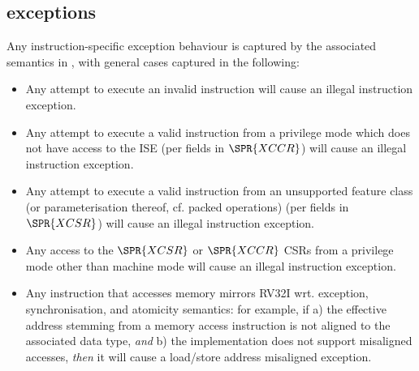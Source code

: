 \subsection{\XCID exceptions}
\label{sec:spec:exceptions}


Any instruction-specific exception behaviour is captured by the associated
semantics in , with general cases captured in
the following:

\begin{itemize}
\item Any attempt to execute an
      invalid \XCID instruction
      will cause an 
      illegal instruction exception.
\item Any attempt to execute a
        valid \XCID instruction
      from a privilege mode which does not have access to the ISE
      (per fields in $\SPR{XCCR}$)
      will cause an
      illegal instruction exception.
\item Any attempt to execute a
        valid \XCID instruction
      from an unsupported feature class (or parameterisation thereof, cf. packed operations)
      (per fields in $\SPR{XCSR}$) 
      will cause an 
      illegal instruction exception.
\item Any access to the 
      $\SPR{XCSR}$ or $\SPR{XCCR}$
      CSRs from a privilege mode other than machine mode
      will cause an 
      illegal instruction exception.
\item Any instruction that accesses memory mirrors RV32I wrt. exception,
      synchronisation, and atomicity semantics: for example, if
      a) the effective address stemming from a memory access instruction
         is not aligned to the associated data type, 
         {\em  and}
      b) the implementation does not support misaligned accesses,
         {\em then}
         it will cause a 
         load/store address misaligned exception.
\end{itemize}


